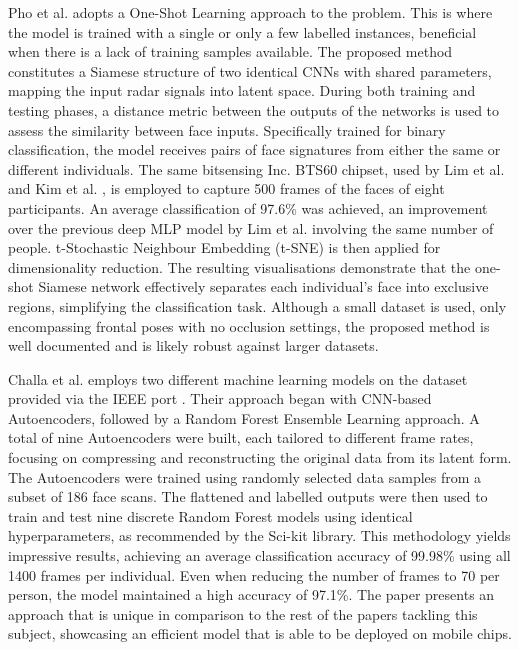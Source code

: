 \documentclass{mpaper}
\begin{document}
Pho et al. \cite{pho2021radar} adopts a One-Shot Learning approach to the problem. This is where the model is trained with a single or only a few labelled instances, beneficial when there is a lack of training samples available. The proposed method constitutes a Siamese structure of two identical CNNs with shared parameters, mapping the input radar signals into latent space. During both training and testing phases, a distance metric between the outputs of the networks is used to assess the similarity between face inputs. Specifically trained for binary classification, the model receives pairs of face signatures from either the same or different individuals. The same bitsensing Inc. BTS60 chipset, used by Lim et al. and Kim et al. \cite{lim2020dnn, kim2020face}, is employed to capture 500 frames of the faces of eight participants. An average classification of 97.6\% was achieved, an improvement over the previous deep MLP model by Lim et al. involving the same number of people. t-Stochastic Neighbour Embedding (t-SNE) \cite{van2008visualizing} is then applied for dimensionality reduction. The resulting visualisations demonstrate that the one-shot Siamese network effectively separates each individual's face into exclusive regions, simplifying the classification task. Although a small dataset is used, only encompassing frontal poses with no occlusion settings, the proposed method is well documented and is likely robust against larger datasets.

Challa et al. \cite{challa2021face} employs two different machine learning models on the dataset provided via the IEEE port \cite{mmwavefacedata}. Their approach began with CNN-based Autoencoders, followed by a Random Forest Ensemble Learning approach. A total of nine Autoencoders were built, each tailored to different frame rates, focusing on compressing and reconstructing the original data from its latent form. The Autoencoders were trained using randomly selected data samples from a subset of 186 face scans. The flattened and labelled outputs were then used to train and test nine discrete Random Forest models using identical hyperparameters, as recommended by the Sci-kit library. This methodology yields impressive results, achieving an average classification accuracy of 99.98\% using all 1400 frames per individual. Even when reducing the number of frames to 70 per person, the model maintained a high accuracy of 97.1\%. The paper presents an approach that is unique in comparison to the rest of the papers tackling this subject, showcasing an efficient model that is able to be deployed on mobile chips.
\end{document}
